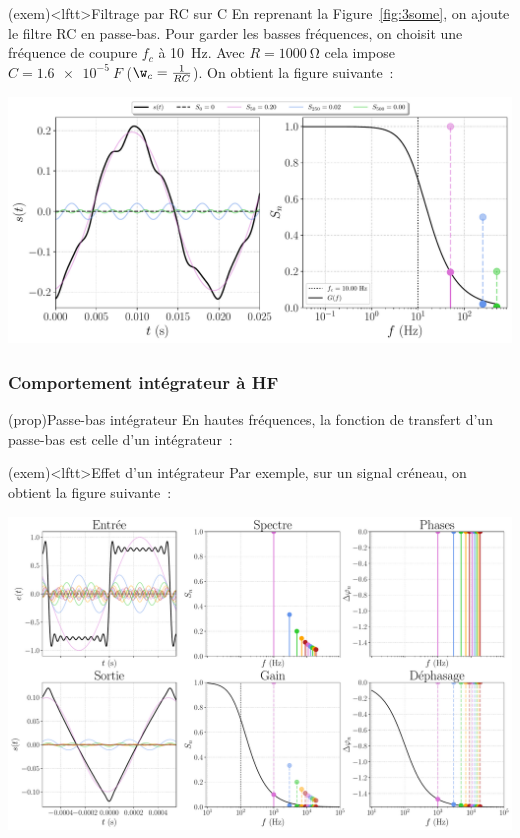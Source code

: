 \documentclass[../../main/main.tex]{subfiles}
\begin{document}
\begin{tcb*}(exem)<lftt>{Filtrage par RC sur C}
	En reprenant la Figure~\ref{fig:3some}, on ajoute le filtre RC en passe-bas.
	Pour garder les basses fréquences, on choisit une fréquence de coupure $f_c$ à
	\SI{10}{Hz}. Avec $R = \SI{1000}{\ohm}$ cela impose $C = \SI{1.6e-5}{F}$
	($\w_c = \frac{1}{RC}$). On obtient la figure suivante~:
	\begin{center}
		\includegraphics[width=.90\linewidth]{fft_50_[1,5,10]_[1,0.5,0.2]_fc=10}
		\vspace{-15pt}
		\label{fig:3some_fltrd}
	\end{center}
	\vspace{-15pt}
\end{tcb*}

\subsubsection{Comportement intégrateur à HF}
\begin{tcb*}(prop){Passe-bas intégrateur}
	En hautes fréquences, la fonction de transfert d'un passe-bas est celle d'un intégrateur~:
\end{tcb*}

\begin{tcb*}(exem)<lftt>{Effet d'un intégrateur}
	Par exemple, sur un signal créneau, on obtient la figure suivante~:
	\begin{center}
		\includegraphics[width=.95\linewidth]{fft_creneau_bth-fe=1000-fc=100}
		\label{fig:creneauPB}
	\end{center}
\end{tcb*}
\end{document}
